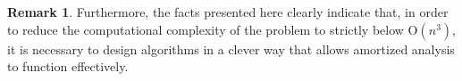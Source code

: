 \documentclass[letter,11pt]{article}
\theoremstyle{definition}
\newtheorem{rem}{Remark}
\theoremstyle{definition}
\newcommand{\1}{\boldmath$~1~$\unboldmath}
\newcommand{\Ord}{\mathrm{O}}
\begin{document}
\begin{rem}
Furthermore, the facts presented here clearly indicate that,
in order to reduce the computational complexity of the problem to strictly below $\Ord(n^3)$,
it is necessary to design algorithms in a clever way that allows amortized analysis to function effectively.



\end{rem}
\end{document}

